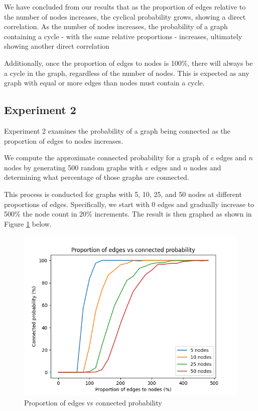 \documentclass[titlepage]{article}
\begin{document}
We have concluded from our results that as the proportion of edges relative to the number of nodes increases, the cyclical probability grows, showing a direct correlation. As the number of nodes increases, the probability of a graph containing a cycle - with the same relative proportions - increases, ultimately showing another direct correlation

Additionally, once the proportion of edges to nodes is 100\%, there will always be a cycle in the graph, regardless of the number of nodes. This is expected as any graph with equal or more edges than nodes must contain a cycle.

\subsection{Experiment 2}

Experiment 2 examines the probability of a graph being connected as the proportion of edges to nodes increases.

We compute the approximate connected probability for a graph of $e$ edges and $n$ nodes by generating 500 random graphs with $e$ edges and $n$ nodes and determining what percentage of those graphs are connected.

This process is conducted for graphs with 5, 10, 25, and 50 nodes at different proportions of edges. Specifically, we start with 0 edges and gradually increase to 500\% the node count in 20\% increments. The result is then graphed as shown in Figure \ref{fig:edges_vs_connected} below.

\begin{figure}[H]
    \centering
    \includegraphics[width=0.8\linewidth]{experiment_2.png}
    \caption{Proportion of edges vs connected probability}
    \label{fig:edges_vs_connected}
\end{figure}
\end{document}
